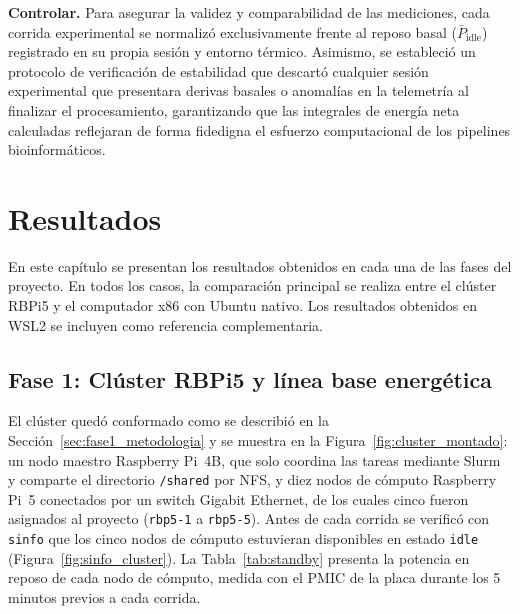 \documentclass[12pt,oneside,spanish]{book}
\begin{document}
    \textbf{Controlar.} Para asegurar la validez y comparabilidad de las mediciones, cada corrida experimental se normalizó exclusivamente frente al reposo basal ($\bar{P}_{\text{idle}}$) registrado en su propia sesión y entorno térmico. Asimismo, se estableció un protocolo de verificación de estabilidad que descartó cualquier sesión experimental que presentara derivas basales o anomalías en la telemetría al finalizar el procesamiento, garantizando que las integrales de energía neta calculadas reflejaran de forma fidedigna el esfuerzo computacional de los pipelines bioinformáticos.
    
    
    
    
    \chapter{Resultados}
    \label{cap:resultados}
    
    En este capítulo se presentan los resultados obtenidos en cada una de las fases del proyecto. En todos los casos, la comparación principal se realiza entre el clúster RBPi5 y el computador x86 con Ubuntu nativo. Los resultados obtenidos en WSL2 se incluyen como referencia complementaria.
    
    \section{Fase 1: Clúster RBPi5 y línea base energética}
    
    El clúster quedó conformado como se describió en la Sección~\ref{sec:fase1_metodologia} y se muestra en la Figura~\ref{fig:cluster_montado}: un nodo maestro Raspberry Pi~4B, que solo coordina las tareas mediante Slurm y comparte el directorio \texttt{/shared} por NFS, y diez nodos de cómputo Raspberry Pi~5 conectados por un switch Gigabit Ethernet, de los cuales cinco fueron asignados al proyecto (\texttt{rbp5-1} a \texttt{rbp5-5}). Antes de cada corrida se verificó con \texttt{sinfo} que los cinco nodos de cómputo estuvieran disponibles en estado \texttt{idle} (Figura~\ref{fig:sinfo_cluster}). La Tabla~\ref{tab:standby} presenta la potencia en reposo de cada nodo de cómputo, medida con el PMIC de la placa durante los 5 minutos previos a cada corrida.
    
\end{document}
